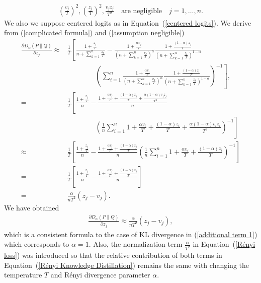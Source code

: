 \begin{rem}
\begin{align}
    \left(\frac{v_j}{T}\right)^2, \left(\frac{z_j}{T}\right)^2,\frac{v_jz_j}{T^2} \quad \text{are negligible} \quad j=1,\dots,n.
    \label{assumption negligible}
\end{align}
We also we suppose centered logits as in Equation~(\ref{centered logits}). We derive from (\ref{complicated formula}) and (\ref{assumption negligible})
\begin{align*}
	\frac{\partial D_\alpha(P \| Q)}{\partial z_j}\approx & \frac{1}{T} \left[ \frac{1+{\frac{z_j}{T}}}{n + \sum_{k=1}^{n} {\frac{z_k}{T}}} - \frac{1+{\frac{\alpha v_j}{T}}}{\left( n + \sum_{k=1}^{n} {\frac{v_k}{T}}\right)^\alpha} \frac{1+{\frac{(1-\alpha) z_j}{T}}}{\left( n + \sum_{k=1}^{n} {\frac{z_k}{T}}\right)^{1-\alpha}} \right. \\
	& \qquad \qquad \left. \left( \sum_{i=1}^{n} \frac{1+{\frac{\alpha v_i}{T}}}{\left( n + \sum_{k=1}^{n} {\frac{v_k}{T}}\right)^\alpha} \frac{1+{\frac{(1-\alpha) z_i}{T}}}{\left( n + \sum_{k=1}^{n} {\frac{z_k}{T}}\right)^{1-\alpha}} \right)^{-1} \right], \\
	=& \frac{1}{T} \left[ \frac{1+\frac{z_j}{T}}{n} - \frac{1 + \frac{\alpha v_j}{T} + \frac{(1-\alpha) z_j}{T} + \frac{\alpha (1-\alpha) v_j z_j}{T^2}}{n} \right. \\
	& \qquad \qquad \left. \left( \frac{1}{n} \sum_{i=1}^{n} 1 + \frac{\alpha v_i}{T} + \frac{(1-\alpha) z_i}{T} + \frac{\alpha (1-\alpha) v_i z_i}{T^2} \right)^{-1} \right]\\
    \approx& \frac{1}{T} \left[ \frac{1+\frac{z_j}{T}}{n} - \frac{1 + \frac{\alpha v_j}{T} + \frac{(1-\alpha) z_j}{T}}{n}\left( \frac{1}{n} \sum_{i=1}^{n} 1 + \frac{\alpha v_i}{T} + \frac{(1-\alpha) z_i}{T}\right)^{-1} \right]\\
    =&\frac{1}{T} \left[ \frac{1+\frac{z_j}{T}}{n} - \frac{1 + \frac{\alpha v_j}{T} + \frac{(1-\alpha) z_j}{T}}{n}\right]\\
    =&\frac{\alpha}{nT^2} (z_j - v_j).
\end{align*}
We have obtained
\begin{align*}
    \frac{\partial D_\alpha(P \| Q)}{\partial z_j}\approx\frac{\alpha}{nT^2} (z_j - v_j),
\end{align*}
which is a consistent formula to the case of KL divergence in (\ref{additional term 1}) which corresponds to $\alpha=1$. Also, the normalization term $\frac{\alpha}{T^2}$ in Equation~(\ref{Rényi loss}) was introduced so that the relative contribution of both terms in Equation~(\ref{Rényi Knowledge Distillation}) remains the same with changing the temperature $T$ and Rényi divergence parameter $\alpha$.
\end{rem}

